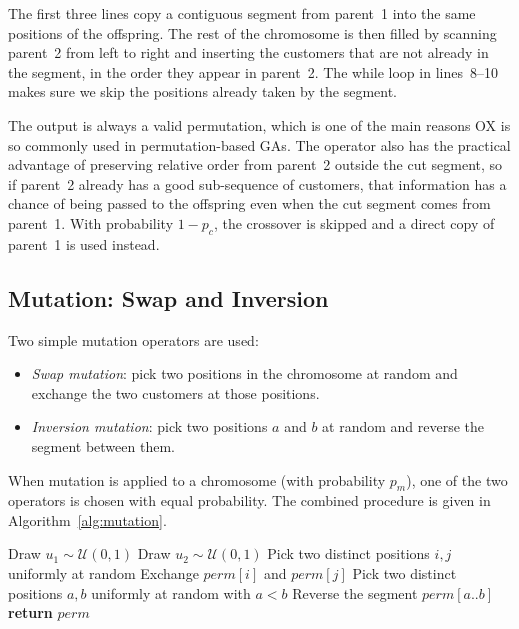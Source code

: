 \documentclass [a4paper, 11pt, titlepage] {article}
\begin{document}
The first three lines copy a contiguous segment from parent~1 into the same positions of the offspring. The rest of the chromosome is then filled by scanning parent~2 from left to right and inserting the customers that are not already in the segment, in the order they appear in parent~2. The while loop in lines~8--10 makes sure we skip the positions already taken by the segment.

The output is always a valid permutation, which is one of the main reasons OX is so commonly used in permutation-based GAs. The operator also has the practical advantage of preserving relative order from parent~2 outside the cut segment, so if parent~2 already has a good sub-sequence of customers, that information has a chance of being passed to the offspring even when the cut segment comes from parent~1. With probability $1 - p_c$, the crossover is skipped and a direct copy of parent~1 is used instead.

\subsection{Mutation: Swap and Inversion}
\label{sec:mutation}

Two simple mutation operators are used:

\begin{itemize}
    \item \emph{Swap mutation}: pick two positions in the chromosome at random and exchange the two customers at those positions.
    \item \emph{Inversion mutation}: pick two positions $a$ and $b$ at random and reverse the segment between them.
\end{itemize}

When mutation is applied to a chromosome (with probability $p_m$), one of the two operators is chosen with equal probability. The combined procedure is given in Algorithm~\ref{alg:mutation}.

\begin{algorithm}[H]
\caption{Mutation Operator}
\label{alg:mutation}
\begin{algorithmic}[1]
    \STATE Draw $u_1 \sim \mathcal{U}(0,1)$
        \STATE Draw $u_2 \sim \mathcal{U}(0,1)$
            \STATE Pick two distinct positions $i, j$ uniformly at random 
            \STATE Exchange $perm[i]$ and $perm[j]$
        \ELSE
            \STATE Pick two distinct positions $a, b$ uniformly at random with $a < b$ 
            \STATE Reverse the segment $perm[a..b]$
        \ENDIF
    \ENDIF
    \STATE \textbf{return} $perm$
\end{algorithmic}
\end{algorithm}
\end{document}
